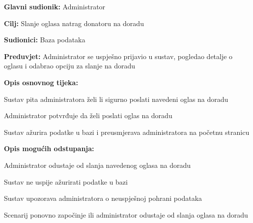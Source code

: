 					\noindent {}
					\begin{packed_item}
	
						\item \textbf{Glavni sudionik: }Administrator
						\item  \textbf{Cilj:} Slanje oglasa natrag donatoru na doradu
						\item  \textbf{Sudionici:} Baza podataka
						\item  \textbf{Preduvjet:} Administrator se uspješno prijavio u sustav, pogledao detalje o oglasu i odabrao opciju za slanje na doradu
						\eject
						\item  \textbf{Opis osnovnog tijeka:}
						
						\item[] \begin{packed_enum}
							\item Sustav pita administratora želi li sigurno poslati navedeni oglas na doradu
							\item Administrator potvrđuje da želi poslati oglas na doradu
							\item Sustav ažurira podatke u bazi i preusmjerava administratora na početnu stranicu
						\end{packed_enum}

						\item  \textbf{Opis mogućih odstupanja:}

						\item[] \begin{packed_item}
							\item[2.a] Administrator odustaje od slanja navedenog oglasa na doradu
							\item[3.a] Sustav ne uspije ažurirati podatke u bazi
							\item[] \begin{packed_enum}
								\item Sustav upozorava administratora o neuspješnoj pohrani podataka
								\item Scenarij ponovno započinje ili administrator odustaje od slanja oglasa na doradu
							\end{packed_enum}					
						\end{packed_item}
					\end{packed_item}

